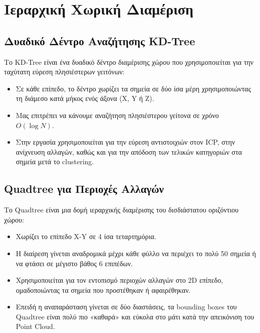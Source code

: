 \documentclass[acmsmall,screen,nonacm]{acmart}
\begin{document}
	\section{Ιεραρχική Χωρική Διαμέριση}
	
	\subsection{Δυαδικό Δέντρο Αναζήτησης KD-Tree}
	Το KD-Tree είναι ένα δυαδικό δέντρο διαμέρισης χώρου που χρησιμοποιείται για την ταχύτατη εύρεση πλησιέστερων γειτόνων:
	\begin{itemize}
		\item Σε κάθε επίπεδο, το δέντρο χωρίζει τα σημεία σε δύο ίσα μέρη χρησιμοποιώντας τη διάμεσο κατά μήκος ενός άξονα (X, Y ή Z).
		\item Μας επιτρέπει να κάνουμε αναζήτηση πλησιέστερου γείτονα σε χρόνο $O(\log N)$.
		\item Στην εργασία χρησιμοποιείται για την εύρεση αντιστοιχιών στον ICP, στην ανίχνευση αλλαγών, καθώς και για την απόδοση των τελικών κατηγοριών στα σημεία μετά το clustering.
	\end{itemize}
	
	\subsection{Quadtree για Περιοχές Αλλαγών}
	Το Quadtree είναι μια δομή ιεραρχικής διαμέρισης του δισδιάστατου οριζόντιου χώρου:
	\begin{itemize}
		\item Χωρίζει το επίπεδο X-Y σε 4 ίσα τεταρτημόρια.
		\item Η διαίρεση γίνεται αναδρομικά μέχρι κάθε φύλλο να περιέχει το πολύ 50 σημεία ή να φτάσει σε μέγιστο βάθος 6 επιπέδων.
		\item Χρησιμοποιείται για τον εντοπισμό περιοχών αλλαγών στο 2D επίπεδο, ομαδοποιώντας τα σημεία που προστέθηκαν ή αφαιρέθηκαν.
		\item Επειδή η αναπαράσταση γίνεται σε δύο διαστάσεις, τα bounding boxes του Quadtree είναι πολύ πιο «καθαρά» και εύκολα στο μάτι κατά την απεικόνιση του Point Cloud.
	\end{itemize}
	
\end{document}
